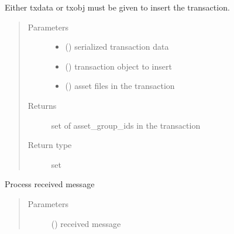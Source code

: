 \documentclass[letterpaper,10pt,english]{sphinxmanual}
\begin{document}
\begin{fulllineitems}
\begin{fulllineitems}
Either txdata or txobj must be given to insert the transaction.
\begin{quote}\begin{description}
\item[{Parameters}] \leavevmode\begin{itemize}
\item {} 
 () \textendash{} serialized transaction data

\item {} 
 ({\hyperref[\detokenize{bbc1.core.bbclib:bbc1.core.bbclib.BBcTransaction}]{}}) \textendash{} transaction object to insert

\item {} 
 () \textendash{} asset files in the transaction

\end{itemize}

\item[{Returns}] \leavevmode
set of asset\_group\_ids in the transaction

\item[{Return type}] \leavevmode
set

\end{description}\end{quote}

\end{fulllineitems}


\begin{fulllineitems}
\label{\detokenize{bbc1.core.data_handler:bbc1.core.data_handler.DataHandler.process_message}}
Process received message
\begin{quote}\begin{description}
\item[{Parameters}] \leavevmode
{} () \textendash{} received message

\end{description}\end{quote}


\end{fulllineitems}
\end{fulllineitems}
\end{document}
